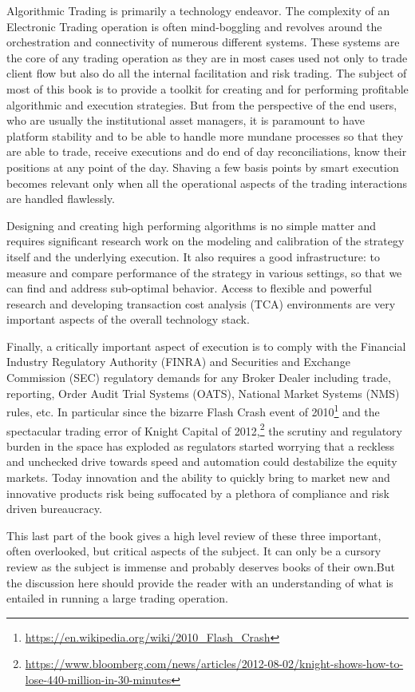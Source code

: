
Algorithmic Trading is primarily a technology endeavor. The complexity of an Electronic Trading operation is often mind-boggling and revolves around the orchestration and connectivity of numerous different systems. These systems are the core of any trading operation as they are in most cases used not only to trade client flow but also do all the internal facilitation and risk trading. The subject of most of this book is to provide a toolkit for creating and for performing profitable algorithmic and execution strategies. But from the perspective of the end users, who are usually the institutional asset managers, it is paramount to have platform stability and to be able to handle more mundane processes so that they are able to trade, receive executions and do end of day reconciliations, know their positions at any point of the day. Shaving a few basis points by smart execution becomes relevant only when all the operational aspects of the trading interactions are handled flawlessly.


Designing and creating high performing algorithms is no simple matter and requires significant research work on the modeling and calibration of the strategy itself and the underlying execution. It also requires a good infrastructure: to measure and compare performance of the strategy in various settings, so that we can find and address sub-optimal behavior. Access to flexible and powerful research and developing transaction cost analysis (TCA) environments are very important aspects of the overall technology stack.

Finally, a critically important aspect of execution is to comply with the Financial Industry Regulatory Authority (FINRA) and Securities and Exchange Commission (SEC) regulatory demands for any Broker Dealer including trade, reporting, Order Audit Trial Systems (OATS), National Market Systems (NMS) rules, etc. In particular since the bizarre Flash Crash event of 2010\footnote{\url{https://en.wikipedia.org/wiki/2010_Flash_Crash}} and the spectacular trading error of Knight Capital of 2012,\footnote{\url{https://www.bloomberg.com/news/articles/2012-08-02/knight-shows-how-to-lose-440-million-in-30-minutes}} the scrutiny and regulatory burden in the space has exploded as regulators started worrying that a reckless and unchecked drive towards speed and automation could destabilize the equity markets. Today innovation and the ability to quickly bring to market new and innovative products risk being suffocated by a plethora of compliance and risk driven bureaucracy. 

This last part of the book gives a high level review of these three important, often overlooked, but critical aspects of the subject. It can only be a cursory review as the subject is immense and probably deserves books of their own.But the discussion here should provide the reader with an understanding of what is entailed in running a large trading operation.